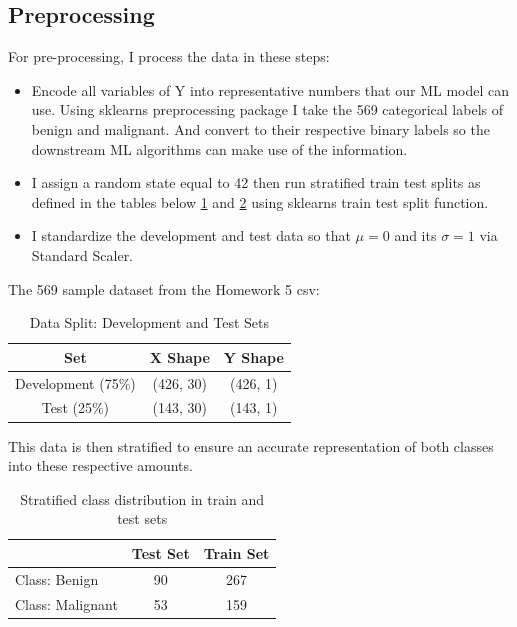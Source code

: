 \documentclass{article}
\begin{document}
\subsection{Preprocessing}
For pre-processing, I process the data in these steps:
\begin{itemize}
    \item[1)]  Encode all variables of Y into representative numbers that our ML model can use. Using sklearns preprocessing package I take the 569 categorical labels of benign and malignant. And convert to their respective binary labels so the downstream ML algorithms can make use of the information.
    \item[2)] I assign a random state equal to 42 then run stratified train test splits as defined in the tables below \ref{tab:data_split} and \ref{tab:stratify} using sklearns train test split function.
    \item[3)]  I standardize the development and test data so that $\mu=0$ and its $\sigma=1$ via Standard Scaler.
\end{itemize}
The 569 sample dataset from the Homework 5 csv:
\begin{table}[ht]
\centering
\begin{tabular}{|c|c|c|}
\hline
Set & X Shape & Y Shape \\
\hline
Development (75\%)   & (426, 30) & (426, 1) \\
Test (25\%)       & (143, 30) & (143, 1) \\
\hline
\end{tabular}
\caption{Data Split: Development and Test Sets}
\label{tab:data_split}
\end{table}

This data is then stratified to ensure an accurate representation of both classes into these respective amounts.

\begin{table}[h!]
\centering
\begin{tabular}{lcc}
\hline
 & Test Set & Train Set \\
\hline
Class: Benign & 90 & 267 \\
Class: Malignant  & 53 & 159 \\
\hline
\end{tabular}
\caption{Stratified class distribution in train and test sets}
\label{tab:stratify}
\end{table}
\end{document}
